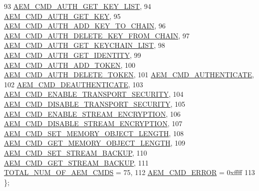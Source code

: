 \begin{DoxyCode}
93     \hyperlink{namespaceavdecc__lib_a1631d53b37995d16b597a5e1a78c55a5a26e02d4c874444c3457b272093b22a60}{AEM\_CMD\_AUTH\_GET\_KEY\_LIST},
94     \hyperlink{namespaceavdecc__lib_a1631d53b37995d16b597a5e1a78c55a5a463e35861d0416819c03e931c654025b}{AEM\_CMD\_AUTH\_GET\_KEY},
95     \hyperlink{namespaceavdecc__lib_a1631d53b37995d16b597a5e1a78c55a5a2daeff3a625c8b7cab18698ed8beb393}{AEM\_CMD\_AUTH\_ADD\_KEY\_TO\_CHAIN},
96     \hyperlink{namespaceavdecc__lib_a1631d53b37995d16b597a5e1a78c55a5a8d7d585042741242e60b797d4946c40f}{AEM\_CMD\_AUTH\_DELETE\_KEY\_FROM\_CHAIN},
97     \hyperlink{namespaceavdecc__lib_a1631d53b37995d16b597a5e1a78c55a5a31154e1ecddab8a887ef9fe923550d9b}{AEM\_CMD\_AUTH\_GET\_KEYCHAIN\_LIST},
98     \hyperlink{namespaceavdecc__lib_a1631d53b37995d16b597a5e1a78c55a5a46ec18448aeca89712296d49a8394827}{AEM\_CMD\_AUTH\_GET\_IDENTITY},
99     \hyperlink{namespaceavdecc__lib_a1631d53b37995d16b597a5e1a78c55a5a3f9a564fc0954918e280dd092b5adb36}{AEM\_CMD\_AUTH\_ADD\_TOKEN},
100     \hyperlink{namespaceavdecc__lib_a1631d53b37995d16b597a5e1a78c55a5a4b3082ea9408a9376261183010580674}{AEM\_CMD\_AUTH\_DELETE\_TOKEN},
101     \hyperlink{namespaceavdecc__lib_a1631d53b37995d16b597a5e1a78c55a5af37284dc802b1af734fdfce398a3e1ff}{AEM\_CMD\_AUTHENTICATE},
102     \hyperlink{namespaceavdecc__lib_a1631d53b37995d16b597a5e1a78c55a5a82a99d866bffaac4c273eab4d9332fc7}{AEM\_CMD\_DEAUTHENTICATE},
103     \hyperlink{namespaceavdecc__lib_a1631d53b37995d16b597a5e1a78c55a5a788dd405625ae31f1a231c1233d32ea7}{AEM\_CMD\_ENABLE\_TRANSPORT\_SECURITY},
104     \hyperlink{namespaceavdecc__lib_a1631d53b37995d16b597a5e1a78c55a5a69f41679b3ed4d4583ecf29d6f2a5fe8}{AEM\_CMD\_DISABLE\_TRANSPORT\_SECURITY},
105     \hyperlink{namespaceavdecc__lib_a1631d53b37995d16b597a5e1a78c55a5a82336e5e52b52fc5899a45ffce214ee5}{AEM\_CMD\_ENABLE\_STREAM\_ENCRYPTION},
106     \hyperlink{namespaceavdecc__lib_a1631d53b37995d16b597a5e1a78c55a5aea3100d650904bfa60f8fb6f80bbad94}{AEM\_CMD\_DISABLE\_STREAM\_ENCRYPTION},
107     \hyperlink{namespaceavdecc__lib_a1631d53b37995d16b597a5e1a78c55a5a193b02373d5f8c5eec7b5121f07517c3}{AEM\_CMD\_SET\_MEMORY\_OBJECT\_LENGTH},
108     \hyperlink{namespaceavdecc__lib_a1631d53b37995d16b597a5e1a78c55a5abb1f8a79ba0b00fe0ee94ef4ca9e6cf4}{AEM\_CMD\_GET\_MEMORY\_OBJECT\_LENGTH},
109     \hyperlink{namespaceavdecc__lib_a1631d53b37995d16b597a5e1a78c55a5a3bac9ebc3449d12a3852f57a96939e5d}{AEM\_CMD\_SET\_STREAM\_BACKUP},
110     \hyperlink{namespaceavdecc__lib_a1631d53b37995d16b597a5e1a78c55a5ae1cd7427d88b500871b78b4c30763ba5}{AEM\_CMD\_GET\_STREAM\_BACKUP},
111     \hyperlink{namespaceavdecc__lib_a1631d53b37995d16b597a5e1a78c55a5a2652011764b6cd6e327a6bcbbccb422b}{TOTAL\_NUM\_OF\_AEM\_CMDS} = 75, 
112     \hyperlink{namespaceavdecc__lib_a1631d53b37995d16b597a5e1a78c55a5ada262e1bc3d456b3991827e82638572d}{AEM\_CMD\_ERROR} = 0xffff
113 \};
\end{DoxyCode}
